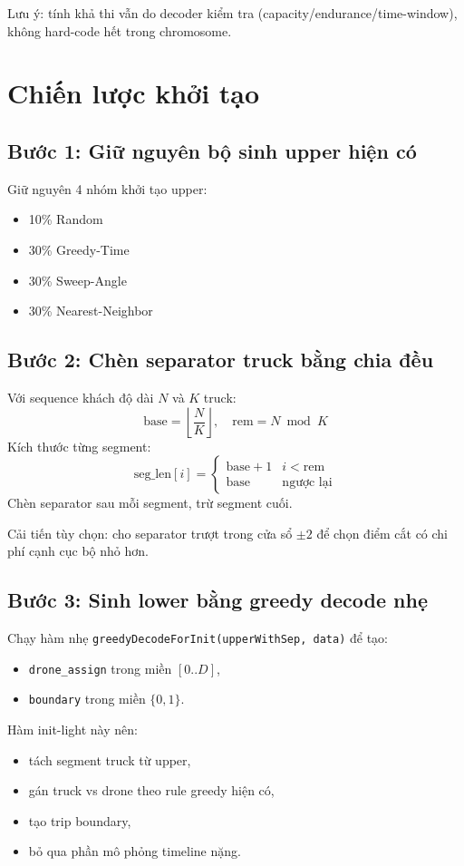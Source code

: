 \documentclass[12pt,a4paper]{article}
\begin{document}
Lưu ý: tính khả thi vẫn do decoder kiểm tra (capacity/endurance/time-window), không hard-code hết trong chromosome.

\section{Chiến lược khởi tạo}
\subsection{Bước 1: Giữ nguyên bộ sinh upper hiện có}
Giữ nguyên 4 nhóm khởi tạo upper:
\begin{itemize}[leftmargin=1.2cm]
    \item 10\% Random
    \item 30\% Greedy-Time
    \item 30\% Sweep-Angle
    \item 30\% Nearest-Neighbor
\end{itemize}

\subsection{Bước 2: Chèn separator truck bằng chia đều}
Với sequence khách độ dài $N$ và $K$ truck:
\[
\text{base}=\left\lfloor\frac{N}{K}\right\rfloor,\quad
\text{rem}=N\bmod K
\]
Kích thước từng segment:
\[
\text{seg\_len}[i]=
\begin{cases}
\text{base}+1 & i<\text{rem}\\
\text{base} & \text{ngược lại}
\end{cases}
\]
Chèn separator sau mỗi segment, trừ segment cuối.

Cải tiến tùy chọn: cho separator trượt trong cửa sổ $\pm 2$ để chọn điểm cắt có chi phí cạnh cục bộ nhỏ hơn.

\subsection{Bước 3: Sinh lower bằng greedy decode nhẹ}
Chạy hàm nhẹ \texttt{greedyDecodeForInit(upperWithSep, data)} để tạo:
\begin{itemize}[leftmargin=1.2cm]
    \item \texttt{drone\_assign} trong miền $[0..D]$,
    \item \texttt{boundary} trong miền $\{0,1\}$.
\end{itemize}

Hàm init-light này nên:
\begin{itemize}[leftmargin=1.2cm]
    \item tách segment truck từ upper,
    \item gán truck vs drone theo rule greedy hiện có,
    \item tạo trip boundary,
    \item bỏ qua phần mô phỏng timeline nặng.
\end{itemize}
\end{document}
